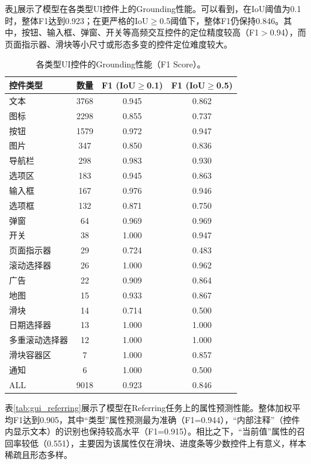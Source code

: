 表\ref{tab:gui_grounding}展示了模型在各类型UI控件上的Grounding性能。可以看到，在IoU阈值为0.1时，整体F1达到0.923；在更严格的IoU$\ge$0.5阈值下，整体F1仍保持0.846。其中，按钮、输入框、弹窗、开关等高频交互控件的定位精度较高（F1$>$0.94），而页面指示器、滑块等小尺寸或形态多变的控件定位难度较大。

\begin{table}[htbp]
\centering
\caption{各类型UI控件的Grounding性能（F1 Score）。}
\label{tab:gui_grounding}
\small
\renewcommand{\arraystretch}{1.2}
\begin{tabular}{lccc}
\toprule
控件类型 & 数量 & F1 (IoU$\ge$0.1) & F1 (IoU$\ge$0.5) \\
\midrule
文本 & 3768 & 0.945 & 0.862 \\
图标 & 2298 & 0.855 & 0.737 \\
按钮 & 1579 & 0.972 & 0.947 \\
图片 & 347 & 0.850 & 0.836 \\
导航栏 & 298 & 0.983 & 0.930 \\
选项区 & 183 & 0.945 & 0.863 \\
输入框 & 167 & 0.976 & 0.946 \\
选项框 & 132 & 0.871 & 0.750 \\
弹窗 & 64 & 0.969 & 0.969 \\
开关 & 38 & 1.000 & 0.947 \\
页面指示器 & 29 & 0.724 & 0.483 \\
滚动选择器 & 26 & 1.000 & 0.962 \\
广告 & 22 & 0.909 & 0.864 \\
地图 & 15 & 0.933 & 0.867 \\
滑块 & 14 & 0.714 & 0.500 \\
日期选择器 & 13 & 1.000 & 1.000 \\
多重滚动选择器 & 12 & 1.000 & 1.000 \\
滑块容器区 & 7 & 1.000 & 0.857 \\
通知 & 6 & 1.000 & 0.500 \\
ALL & 9018 & 0.923 & 0.846 \\
\bottomrule
\end{tabular}

\end{table}

表\ref{tab:gui_referring}展示了模型在Referring任务上的属性预测性能。整体加权平均F1达到0.905，其中“类型”属性预测最为准确（F1=0.944），“内部注释”（控件内显示文本）的识别也保持较高水平（F1=0.915）。相比之下，“当前值”属性的召回率较低（0.551），主要因为该属性仅在滑块、进度条等少数控件上有意义，样本稀疏且形态多样。

